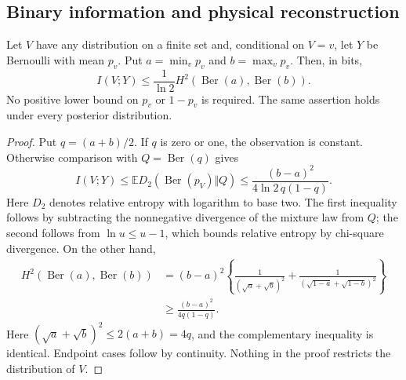 \subsection{Binary information and physical reconstruction}
\begin{lemma}
\label{lem:hellinger-capacity}
Let $V$ have any distribution on a finite set and, conditional on
$V=v$, let $Y$ be Bernoulli with mean $p_v$. Put
$a=\min_vp_v$ and $b=\max_vp_v$. Then, in bits,
\begin{equation}\label{eq:hellinger-capacity}
 I(V;Y)\le\frac1{\ln2}
 H^2(\operatorname{Ber}(a),\operatorname{Ber}(b)).
\end{equation}
No positive lower bound on $p_v$ or $1-p_v$ is required. The same
assertion holds under every posterior distribution.
\end{lemma}
\begin{proof}
Put $q=(a+b)/2$. If $q$ is zero or one, the observation is constant.
Otherwise comparison with $Q=\operatorname{Ber}(q)$ gives
\[
 I(V;Y)\le\mathbb E D_2(\operatorname{Ber}(p_V)\Vert Q)
 \le\frac{(b-a)^2}{4\ln2\,q(1-q)}.
\]
Here $D_2$ denotes relative entropy with logarithm to base two.
The first inequality follows by subtracting the nonnegative divergence
of the mixture law from $Q$; the second follows from
$\ln u\le u-1$, which bounds relative entropy by chi-square
divergence. On the other hand,
\begin{align*}
 H^2(\operatorname{Ber}(a),\operatorname{Ber}(b))
 &=(b-a)^2\left\{
 \frac1{(\sqrt a+\sqrt b)^2}
 +\frac1{(\sqrt{1-a}+\sqrt{1-b})^2}\right\}\\
 &\ge\frac{(b-a)^2}{4q(1-q)}.
\end{align*}
Here $(\sqrt a+\sqrt b)^2\le2(a+b)=4q$, and the
complementary inequality is identical. Endpoint cases follow by
continuity. Nothing in the proof restricts the distribution of $V$.
\end{proof}

